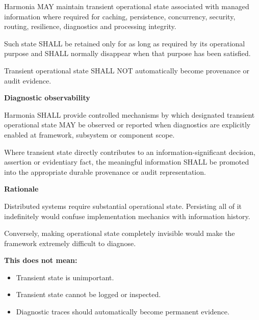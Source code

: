 Harmonia MAY maintain transient operational state associated with
managed information where required for caching, persistence,
concurrency, security, routing, resilience, diagnostics and processing
integrity.



Such state SHALL be retained only for as long as required by its
operational purpose and SHALL normally disappear when that purpose has
been satisfied.



Transient operational state SHALL NOT automatically become provenance or
audit evidence.



\par\medskip\textbf{Diagnostic observability}\par


Harmonia SHALL provide controlled mechanisms by which designated
transient operational state MAY be observed or reported when diagnostics
are explicitly enabled at framework, subsystem or component scope.



Where transient state directly contributes to an information-significant
decision, assertion or evidentiary fact, the meaningful information
SHALL be promoted into the appropriate durable provenance or audit
representation.



\par\medskip\textbf{Rationale}\par


Distributed systems require substantial operational state. Persisting
all of it indefinitely would confuse implementation mechanics with
information history.



Conversely, making operational state completely invisible would make the
framework extremely difficult to diagnose.



\textbf{This does not mean:}



\begin{itemize}


\item Transient state is unimportant.

\item Transient state cannot be logged or inspected.

\item Diagnostic traces should automatically become permanent evidence.

\end{itemize}

